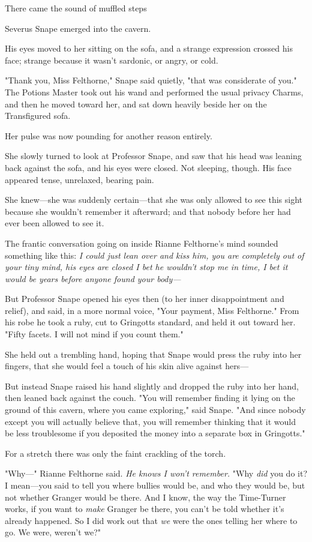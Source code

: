 There came the sound of muffled steps{\el}

Severus Snape emerged into the cavern.

His eyes moved to her sitting on the sofa, and a strange expression crossed his
face; strange because it wasn't sardonic, or angry, or cold.

"Thank you, Miss Felthorne," Snape said quietly, "that was considerate of you."
The Potions Master took out his wand and performed the usual privacy Charms,
and then he moved toward her, and sat down heavily beside her on the
Transfigured sofa.

Her pulse was now pounding for another reason entirely.

She slowly turned to look at Professor Snape, and saw that his head was leaning
back against the sofa, and his eyes were closed. Not sleeping, though. His face
appeared tense, unrelaxed, bearing pain.

She knew—she was suddenly certain—that she was only allowed to see this
sight because she wouldn't remember it afterward; and that nobody before her
had ever been allowed to see it.

The frantic conversation going on inside Rianne Felthorne's mind sounded
something like this: \emph{I could just lean over and kiss him, you are
completely out of your tiny mind, his eyes are closed I bet he wouldn't stop me
in time, I bet it would be years before anyone found your body—}

But Professor Snape opened his eyes then (to her inner disappointment and
relief), and said, in a more normal voice, "Your payment, Miss Felthorne." From
his robe he took a ruby, cut to Gringotts standard, and held it out toward her.
"Fifty facets. I will not mind if you count them."

She held out a trembling hand, hoping that Snape would press the ruby into her
fingers, that she would feel a touch of his skin alive against hers—

But instead Snape raised his hand slightly and dropped the ruby into her hand,
then leaned back against the couch. "You will remember finding it lying on the
ground of this cavern, where you came exploring," said Snape. "And since nobody
except you will actually believe that, you will remember thinking that it would
be less troublesome if you deposited the money into a separate box in
Gringotts."

For a stretch there was only the faint crackling of the torch.

"Why—" Rianne Felthorne said. \emph{He knows I won't remember.} "Why
\emph{did} you do it? I mean—you said to tell you where bullies would be, and
who they would be, but not whether Granger would be there. And I know, the way
the Time-Turner works, if you want to \emph{make} Granger be there, you can't
be told whether it's already happened. So I did work out that \emph{we} were
the ones telling her where to go. We were, weren't we?"

